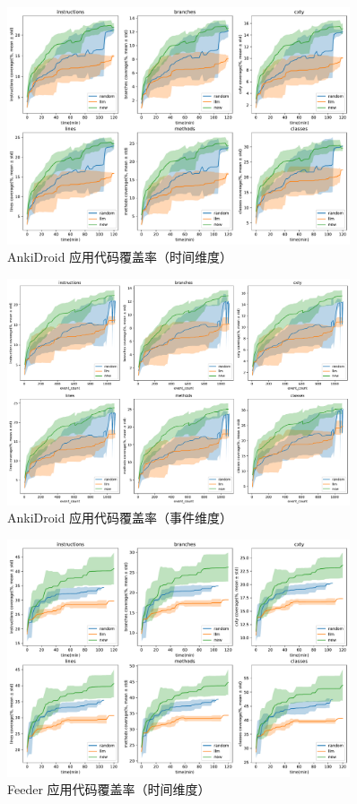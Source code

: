 \documentclass[twocolumn, 10pt]{article}
\begin{document}
\begin{figure}[H]
\centering
\includegraphics[width=0.9\textwidth]{com.ichi2.anki.debug/coverage_time.pdf}
\caption{AnkiDroid 应用代码覆盖率（时间维度）}
\end{figure}

\begin{figure}[H]
\centering
\includegraphics[width=0.9\textwidth]{com.ichi2.anki.debug/coverage_event.pdf}
\caption{AnkiDroid 应用代码覆盖率（事件维度）}
\end{figure}

\begin{figure}[H]
\centering
\includegraphics[width=0.9\textwidth]{com.nononsenseapps.feeder.debug/coverage_time.pdf}
\caption{Feeder 应用代码覆盖率（时间维度）}
\end{figure}
\end{document}
